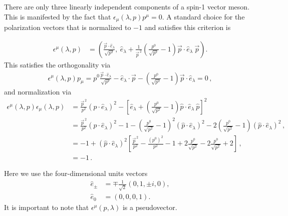 There are only three linearly independent components of a spin-1 vector meson. This is manifested by the fact that $\epsilon_{\mu}(\lambda, p)p^{\mu}=0$. A standard choice for the polarization vectors that is normalized to $-1$ and satisfies this criterion is{ \begin{align}
\epsilon^{\mu}(\lambda, p) & =
\left(\frac{\vec{p}\cdot\hat{e}_\lambda}{ \sqrt{p^2} }, \ \hat{e}_\lambda + \frac{1}{\vec p^{\,2}} \left( \frac{p^0}{\sqrt{p^2}} - 1  \right) {\vec{p}\cdot\hat{e}_\lambda} \ \vec{p}\right) 
.
\end{align}
This satisfies the orthogonality via
 \begin{align}
\epsilon^{\mu}(\lambda, p) p_\mu = p^0 \frac{\vec{p}\cdot\hat{e}_\lambda}{\sqrt{p^2} }  -  \hat{e}_\lambda \cdot \vec p - \left( \frac{p^0}{\sqrt{p^2}} - 1  \right) \vec{p}\cdot\hat{e}_\lambda   = 0 \,,
\end{align}
and normalization via
\begin{align}
\epsilon^{\mu}(\lambda, p) \epsilon_{\mu}(\lambda, p) & = \frac{\vec p^{\,2}}{p^2}  ( \hat{p}\cdot\hat{e}_\lambda)^2 - \left [  \hat{e}_\lambda +   \left( \frac{p^0}{\sqrt{p^2}} - 1  \right) { {\hat p}\cdot\hat{e}_\lambda} \  {\hat p}\right] ^2  \\
& = \frac{\vec p^{\,2}}{p^2} ( \hat{p}\cdot\hat{e}_\lambda)^2 - 1 -    \left( \frac{p^0}{\sqrt{p^2}} - 1  \right)^2 ( { {\hat p}\cdot\hat{e}_\lambda} )^2    - 2    \left( \frac{p^0}{\sqrt{p^2}} - 1  \right) ({ {\hat p}\cdot\hat{e}_\lambda}  )^2 \,, \\
& = -1 + ( \hat{p}\cdot\hat{e}_\lambda)^2 \left[ \frac{\vec p^{\,2}}{p^2}  - \frac{(p^0)^2}{p^2} - 1 + 2 \frac{p^0}{\sqrt{p^2}}     - 2    \frac{p^0}{\sqrt{p^2}} + 2      \right ] \,, \\
& = -1 \,.
\end{align}

Here we use the four-dimensional units vectors
\begin{align}
\hat{e}_\pm&=\mp\frac{1}{\sqrt{2}}(0,1,\pm i,0),
\\
\hat{e}_0&=(0,0,0,1).
\end{align}
It is important to note that $\epsilon^\mu(p,\lambda)$ is a pseudovector. 

}
